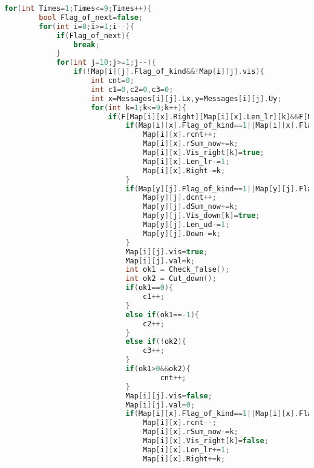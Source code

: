 \begin{lstlisting}[language=C++, firstnumber=1, basicstyle=\tiny]
    for(int Times=1;Times<=9;Times++){
        bool Flag_of_next=false;
        for(int i=8;i>=1;i--){
            if(Flag_of_next){
                break;
            }
            for(int j=10;j>=1;j--){
                if(!Map[i][j].Flag_of_kind&&!Map[i][j].vis){
                    int cnt=0;
                    int c1=0,c2=0,c3=0;
                    int x=Messages[i][j].Lx,y=Messages[i][j].Uy;
                    for(int k=1;k<=9;k++){
                        if(F[Map[i][x].Right][Map[i][x].Len_lr][k]&&F[Map[y][j].Down][Map[y][j].Len_ud][k]&&!Map[i][x].Vis_right[k]&&!Map[y][j].Vis_down[k]){
                            if(Map[i][x].Flag_of_kind==1||Map[i][x].Flag_of_kind==3){
                                Map[i][x].rcnt++;
                                Map[i][x].rSum_now+=k;
                                Map[i][x].Vis_right[k]=true;
                                Map[i][x].Len_lr-=1;
                                Map[i][x].Right-=k;
                            }
                            if(Map[y][j].Flag_of_kind==1||Map[y][j].Flag_of_kind==4){
                                Map[y][j].dcnt++;
                                Map[y][j].dSum_now+=k;
                                Map[y][j].Vis_down[k]=true;
                                Map[y][j].Len_ud-=1;
                                Map[y][j].Down-=k;
                            }
                            Map[i][j].vis=true;
                            Map[i][j].val=k;
                            int ok1 = Check_false();
							int ok2 = Cut_down();
							if(ok1==0){
								c1++;
							}
							else if(ok1==-1){
		                        c2++;
							}
							else if(!ok2){
						 	    c3++;
							}
                            if(ok1>0&&ok2){
                                    cnt++;
							}
                            Map[i][j].vis=false;
                            Map[i][j].val=0;
                            if(Map[i][x].Flag_of_kind==1||Map[i][x].Flag_of_kind==3){//3表示只有右
                                Map[i][x].rcnt--;
                                Map[i][x].rSum_now-=k;
                                Map[i][x].Vis_right[k]=false;
                                Map[i][x].Len_lr+=1;
                                Map[i][x].Right+=k;


\end{lstlisting}
